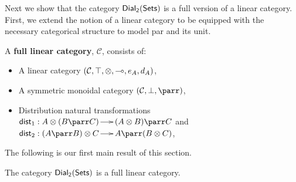 Next we show that the category $\mathsf{Dial_2}(\mathsf{Sets})$ is a full version of a linear
category. First, we extend the notion of a linear category to be
equipped with the necessary categorical structure to model par and its
unit.
\begin{definition}
  \label{def:linear-cat}
  A \textbf{full linear category}, $\mathcal{C}$, consists of:
  \begin{center}
    \begin{itemize}
    \item A linear category $(\mathcal{C}, \top, \otimes, \multimap,e_A,d_A)$,
    \item A symmetric monoidal category $(\mathcal{C}, \perp, \parr)$,
    \item Distribution natural transformations $\mathsf{dist}_1 : A \otimes (B
      \parr C) \to (A \otimes B) \parr C$ and $\mathsf{dist}_2 : (A \parr B)
      \otimes C \to A \parr (B \otimes C)$,
    \end{itemize}
  \end{center}
\end{definition}
\noindent
The following is our first main result of this section.
\begin{lemma}
  \label{lemma:ddial_is_a_linear_category}
  The category $\mathsf{Dial_2}(\mathsf{Sets})$ is a full linear category.
\end{lemma}
